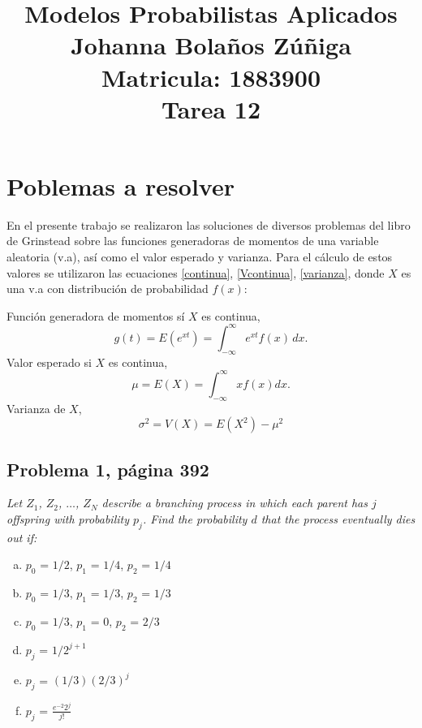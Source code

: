 \documentclass{article}
\title{
\centering
Modelos Probabilistas Aplicados \\
Johanna Bolaños Zúñiga \\
Matricula: 1883900\\
Tarea 12
}
\date{}
\begin{document}
\maketitle

\section{Poblemas a resolver}

En el presente trabajo se realizaron las soluciones de diversos problemas del libro de Grinstead \cite{librop} sobre las funciones generadoras de momentos de una variable aleatoria (v.a), así como el valor esperado y varianza. Para el cálculo de estos valores se utilizaron las ecuaciones \ref{continua}, \ref{Vcontinua}, \ref{varianza}, donde $X$ es una v.a con distribución de probabilidad $f{(x)}$:

\noindent Función generadora de momentos sí $X$ es continua,
\begin{equation}
g{(t)} = E{(e^{xt})} = \int_{-\infty}^{\infty}e^{xt}f(x)\,dx.
\label{continua}
\end{equation}
\noindent Valor esperado si $X$ es continua,
\begin{equation}
\mu = E{(X)} = \int_{-\infty}^{\infty}xf(x)dx.
\label{Vcontinua}
\end{equation}
\noindent Varianza de $X$,
\begin{equation}
\sigma^2 = V(X)= E{(X^2)} - \mu^2
\label{varianza}
\end{equation}

\subsection{Problema 1, página 392}
\noindent \textit{Let $Z_{1}$, $Z_{2}$, $\dots$, $Z_{N}$ describe a branching process in which each parent has $j$ offspring with probability $p_{j}$. Find the probability $d$ that the process eventually dies out if:}

\begin{enumerate}[a)]
    \item $p_{0}$ = $1/2$, $p_{1}$ = $1/4$, $p_{2}$ = $1/4$
    \item $p_{0}$ = $1/3$, $p_{1}$ = $1/3$, $p_{2}$ = $1/3$
    \item $p_{0}$ = $1/3$, $p_{1}$ = $0$, $p_{2}$ = $2/3$
    \item $p_{j}$ = $1/2^{j+1}$
    \item $p_{j}$ = $(1/3)(2/3)^j$
    \item $p_{j}$ = $\frac{e^{-2}2^j}{j!}$
\end{enumerate}  
\end{document}
